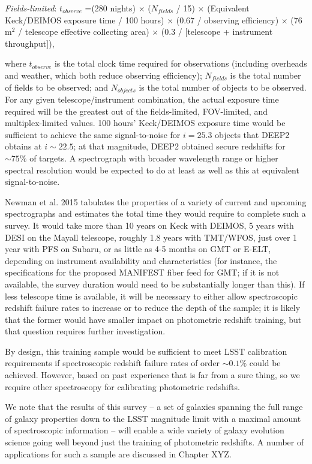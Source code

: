 {\it Fields-limited}:  $t_{observe}$ =(280 nights) $\times$ ($N_{fields}$ / 15) $\times$ (Equivalent Keck/DEIMOS exposure time / 100 hours) $\times$ (0.67 / observing efficiency) $\times$ (76 m$^2$  / telescope effective collecting area) $\times$ (0.3 / [telescope + instrument throughput]), 

where $t_{observe}$ is the total clock time required for observations (including overheads and weather, which both reduce observing efficiency); $N_{fields}$ is the total number of fields to be observed; and $N_{objects}$ is the total number of objects to be observed.   For any given telescope/instrument combination, the actual exposure time required will be the greatest out of the fields-limited, FOV-limited, and multiplex-limited values.  100 hours' Keck/DEIMOS exposure time would be sufficient to achieve the same signal-to-noise for $i=25.3$ objects that DEEP2 obtains at $i \sim 22.5$; at that magnitude, DEEP2 obtained secure redshifts for $\sim 75\%$ of targets.  A spectrograph with broader wavelength range or higher spectral resolution would be expected to do at least as well as this at equivalent signal-to-noise.

Newman et al. 2015 tabulates the properties of a variety of current and upcoming spectrographs and estimates the total time they would require to complete such a survey.  It would take more than 10 years on Keck with DEIMOS, 5 years with DESI on the Mayall telescope, roughly 1.8 years with TMT/WFOS, just over 1 year with PFS on Subaru, or as little as 4-5 months on GMT or E-ELT, depending on instrument availability and characteristics (for instance, the specifications for the proposed MANIFEST fiber feed for GMT; if it is not available, the survey duration would need to be substantially longer than this).  If less telescope time is available, it will be necessary to either allow spectroscopic redshift failure rates to increase or to reduce the depth of the sample; it is likely that the former would have smaller impact on photometric redshift training, but that question requires further investigation.

By design, this training sample would be sufficient to meet LSST calibration requirements if spectroscopic redshift failure rates of order $\sim 0.1\%$ could be achieved.  However, based on past experience that is far from a sure thing, so we require other spectroscopy for calibrating photometric redshifts.  

We note that the results of this survey -- a set of galaxies spanning the full range of galaxy properties down to the LSST magnitude limit with a maximal amount of spectroscopic information -- will enable a wide variety of galaxy evolution science going well beyond just the training of photometric redshifts.  A number of applications for such a sample are discussed in Chapter XYZ.

